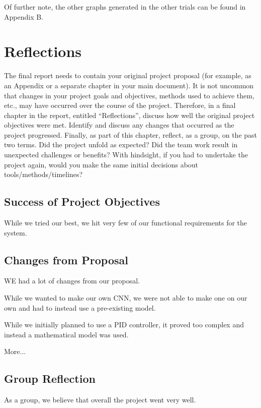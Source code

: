 \documentclass[titlepage,draft]{article}
\begin{document}
{Of further note, the other graphs generated in the other trials can be found in Appendix B.

\section{Reflections}

The final report needs to contain your original project proposal
(for example, as an Appendix or a separate chapter in your main
document). It is not uncommon that changes in your project goals
and objectives, methods used to achieve them, etc., may have
occurred over the course of the project. Therefore, in a final
chapter in the report, entitled “Reflections”, discuss how well
the original project objectives were met. Identify and discuss any
changes that occurred as the project progressed. Finally, as part
of this chapter, reflect, as a group, on the past two terms. Did
the project unfold as expected? Did the team work result in unexpected
challenges or benefits? With hindsight, if you had to undertake the
project again, would you make the same initial decisions about
tools/methods/timelines?

\subsection{Success of Project Objectives}

While we tried our best, we hit very few of our functional requirements for the system.

\subsection{Changes from Proposal}

WE had a lot of changes from our proposal.

While we wanted to make our own CNN, we were not able to make one on our own and had to instead use a pre-existing model.

While we initially planned to use a PID controller, it proved too complex and instead a mathematical model was used.

More...

\subsection{Group Reflection}

As a group, we believe that overall the project went very well.

}
\end{document}
